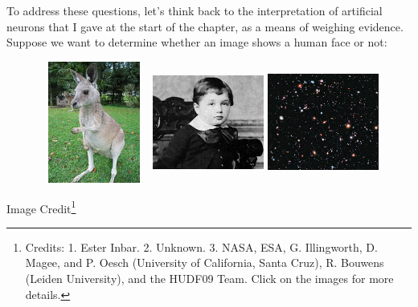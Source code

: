 \documentclass[a4paper,12pt]{report}%
\begin{document}
To address these questions, let's think back to the interpretation of artificial neurons that I gave at the start of the chapter, as a means of weighing evidence. Suppose we want to determine whether an image shows a human face or not:

\begin{figure}[!ht]
\begin{center}
 \includegraphics[width=0.325\textwidth,height=4.0cm]{images/Kangaroo.jpg}
 \includegraphics[width=0.325\textwidth,height=4.0cm]{images/Einstein_crop.jpg}
 \includegraphics[width=0.325\textwidth,height=4.0cm]{images/hubble.jpg}
\end{center}
\end{figure}
Image Credit\footnote{\color{blue} Credits: 1. Ester Inbar. 2. Unknown. 3. NASA, ESA, G. Illingworth, D. Magee, and P. Oesch (University of California, Santa Cruz), R. Bouwens (Leiden University), and the HUDF09 Team. Click on the images for more details.}
\end{document}
